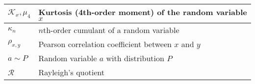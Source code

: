 \documentclass{article}
\begin{document}
\begin{xltabular}{\textwidth}{XX}
    \(\mathcal{K}_x, \mu_4\)                                                                            & Kurtosis (4th-order moment) of the random variable \(x\)\\ \hline
    \(\kappa_n\)                                                                                        & \(n\)th-order cumulant of a random variable \\ \hline
    \(\rho_{x,y}\)                                                                                      & Pearson correlation coefficient between \(x\) and \(y\)\\ \hline
    \(a\sim P\)                                                                                         & Random variable \(a\) with distribution \(P\) \\ \hline
    \(\mathcal{R}\)                                                                                     & Rayleigh's quotient
\end{xltabular}
\end{document}
